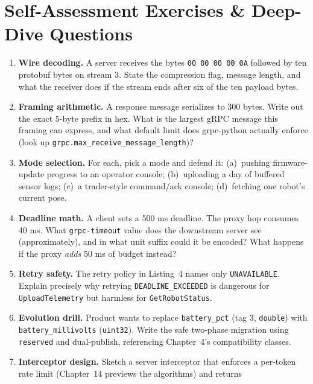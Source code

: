 \section{Self-Assessment Exercises \& Deep-Dive Questions}
\label{sec:ch13-exercises}

\begin{enumerate}
  \item \textbf{Wire decoding.} A server receives the bytes
        \texttt{00 00 00 00 0A} followed by ten protobuf bytes on stream 3.
        State the compression flag, message length, and what the receiver does
        if the stream ends after six of the ten payload bytes.
  \item \textbf{Framing arithmetic.} A response message serializes to 300
        bytes. Write out the exact 5-byte prefix in hex. What is the largest
        gRPC message this framing can express, and what default limit does
        grpc-python actually enforce (look up \texttt{grpc.max\_receive\_message\_length})?
  \item \textbf{Mode selection.} For each, pick a mode and defend it:
        (a)~pushing firmware-update progress to an operator console;
        (b)~uploading a day of buffered sensor logs; (c)~a trader-style
        command/ack console; (d)~fetching one robot's current pose.
  \item \textbf{Deadline math.} A client sets a 500 ms deadline. The proxy hop
        consumes 40 ms. What \texttt{grpc-timeout} value does the downstream
        server see (approximately), and in what unit suffix could it be
        encoded? What happens if the proxy \emph{adds} 50 ms of budget instead?
  \item \textbf{Retry safety.} The retry policy in Listing~4 names only
        \texttt{UNAVAILABLE}. Explain precisely why retrying
        \texttt{DEADLINE\_EXCEEDED} is dangerous for \texttt{UploadTelemetry}
        but harmless for \texttt{GetRobotStatus}.
  \item \textbf{Evolution drill.} Product wants to replace
        \texttt{battery\_pct} (tag 3, \texttt{double}) with
        \texttt{battery\_millivolts} (\texttt{uint32}). Write the safe two-phase
        migration using \texttt{reserved} and dual-publish, referencing
        Chapter~4's compatibility classes.
  \item \textbf{Interceptor design.} Sketch a server interceptor that enforces
        a per-token rate limit (Chapter~14 previews the algorithms) and returns

\end{enumerate}
